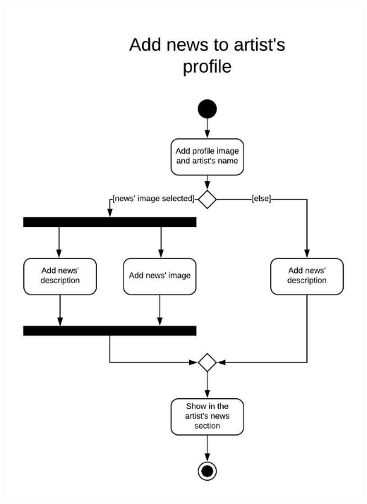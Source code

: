 \documentclass[11pt,a4paper]{article}
\begin{document}
\begin{itemize}
\includegraphics[scale=0.5]{addnews2.jpeg}

\end{itemize}
\end{document}
